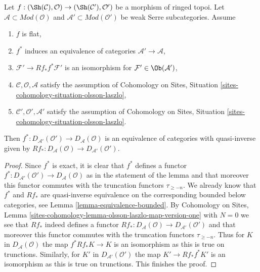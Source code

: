 \begin{lemma}
\label{lemma-equivalence-unbounded-one}
Let $f : (\Sh(\mathcal{C}), \mathcal{O}) \to (\Sh(\mathcal{C}'), \mathcal{O}')$
be a morphism of ringed topoi.
Let $\mathcal{A} \subset \textit{Mod}(\mathcal{O})$
and $\mathcal{A}' \subset \textit{Mod}(\mathcal{O}')$
be weak Serre subcategories. Assume
\begin{enumerate}
\item $f$ is flat,
\item $f^*$ induces an equivalence of categories
$\mathcal{A}' \to \mathcal{A}$,
\item $\mathcal{F}' \to Rf_*f^*\mathcal{F}'$ is an isomorphism
for $\mathcal{F}' \in \Ob(\mathcal{A}')$,
\item $\mathcal{C}, \mathcal{O}, \mathcal{A}$ satisfy the
assumption of
Cohomology on Sites, Situation \ref{sites-cohomology-situation-olsson-laszlo},
\item $\mathcal{C}', \mathcal{O}', \mathcal{A}'$ satisfy the
assumption of
Cohomology on Sites, Situation \ref{sites-cohomology-situation-olsson-laszlo}.
\end{enumerate}
Then $f^* : D_{\mathcal{A}'}(\mathcal{O}') \to D_\mathcal{A}(\mathcal{O})$
is an equivalence of categories with quasi-inverse given by
$Rf_* : D_\mathcal{A}(\mathcal{O}) \to D_{\mathcal{A}'}(\mathcal{O}')$.
\end{lemma}

\begin{proof}
Since $f^*$ is exact, it is clear that $f^*$ defines a functor
$f^* : D_{\mathcal{A}'}(\mathcal{O}') \to D_\mathcal{A}(\mathcal{O})$
as in the statement of the lemma and that moreover this
functor commutes with the truncation functors $\tau_{\geq -n}$.
We already know that $f^*$ and $Rf_*$ are quasi-inverse
equivalence on the corresponding bounded below categories,
see Lemma \ref{lemma-equivalence-bounded}.
By Cohomology on Sites, Lemma
\ref{sites-cohomology-lemma-olsson-laszlo-map-version-one}
with $N = 0$ we see that $Rf_*$ indeed defines a functor
$Rf_* : D_\mathcal{A}(\mathcal{O}) \to D_{\mathcal{A}'}(\mathcal{O}')$
and that moreover this functor commutes with
the truncation functors $\tau_{\geq -n}$.
Thus for $K$ in $D_\mathcal{A}(\mathcal{O})$ the map
$f^*Rf_*K \to K$ is an isomorphism as this is true
on trunctions.
Similarly, for $K'$ in $D_{\mathcal{A}'}(\mathcal{O}')$ the map
$K' \to Rf_*f^*K'$ is an isomorphism as this is true
on trunctions.
This finishes the proof.
\end{proof}

